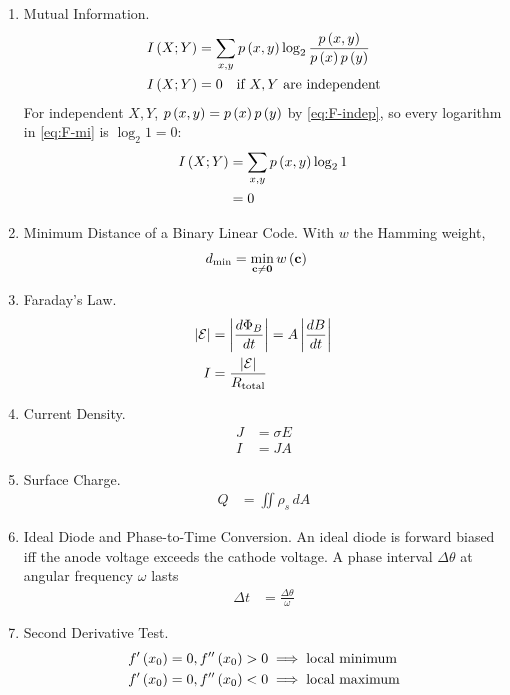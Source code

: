\begin{enumerate}[label=\thesubsection.\arabic*, ref=\thesubsection.\theenumi]
\item Mutual Information.
\begin{align}
I\left(X;Y\right) &= \sum_{x,y} p\left(x,y\right) \log_2 \frac{p\left(x,y\right)}{p\left(x\right)p\left(y\right)}
\label{eq:F-mi}
\\
I\left(X;Y\right) &= 0 \quad \text{if } X, Y \text{ are independent}
\label{eq:F-mi-zero}
\end{align}
\solution For independent $X, Y$, $p\left(x,y\right) = p\left(x\right)p\left(y\right)$ by \eqref{eq:F-indep}, so every logarithm in \eqref{eq:F-mi} is $\log_2 1 = 0$:
\begin{align}
I\left(X;Y\right) &= \sum_{x,y} p\left(x,y\right) \log_2 1
\\
&= 0
\end{align}
\item Minimum Distance of a Binary Linear Code. With $w$ the Hamming weight,
\begin{align}
d_{\min} &= \min_{\mathbf{c} \ne \mathbf{0}} w\left(\mathbf{c}\right)
\label{eq:F-dmin}
\end{align}
\item Faraday's Law.
\begin{align}
\left\vert\mathcal{E}\right\vert &= \left\vert\frac{d\Phi_B}{dt}\right\vert = A \left\vert\frac{dB}{dt}\right\vert
\\
I &= \frac{\left\vert\mathcal{E}\right\vert}{R_{\mathrm{total}}}
\label{eq:F-faraday}
\end{align}
\item Current Density.
\begin{align}
J &= \sigma E
\\
I &= J A
\label{eq:F-J}
\end{align}
\item Surface Charge.
\begin{align}
Q &= \iint \rho_s \,dA
\label{eq:F-charge}
\end{align}
\item Ideal Diode and Phase-to-Time Conversion.
An ideal diode is forward biased iff the anode voltage exceeds the cathode voltage. A phase interval $\Delta \theta$ at angular frequency $\omega$ lasts
\begin{align}
\Delta t &= \frac{\Delta \theta}{\omega}
\label{eq:F-angletime}
\end{align}
\item Second Derivative Test.
\begin{align}
f'\left(x_0\right) = 0, f''\left(x_0\right) > 0 &\implies \text{local minimum}
\label{eq:F-second}
\\
f'\left(x_0\right) = 0, f''\left(x_0\right) < 0 &\implies \text{local maximum}
\end{align}

\end{enumerate}
